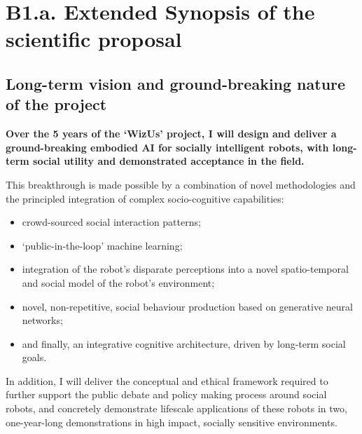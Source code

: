 \documentclass[11pt,a4paper]{report}
\newcommand{\project}{WizUs\xspace}
\newcommand{\eu}[1]{}
\begin{document}

\chapter{B1.a. Extended Synopsis of the scientific proposal}\label{part1}

\eu{(max 5 pages)}

\eu{The Extended Synopsis should give a concise presentation of the scientific
proposal, with particular attention to the ground-breaking nature of the
research project and the feasibility of the outlined scientific approach.
Describe the proposed work in the context of the state of the art of the field.
References to literature should also be included. References do not count
towards the page limits. It is important that this extended synopsis contains
all essential information including the feasibility of the scientific proposal
since the panel will only evaluate Part B1 at step 1.}

\section{Long-term vision and ground-breaking nature of the project}

\begin{framed}

\noindent\bf Over the 5 years of the `\project' project, I will design and deliver a ground-breaking embodied AI for
socially intelligent robots, with long-term social utility and demonstrated
    acceptance in the field.

\vspace{0.3em}
\noindent This breakthrough is made possible by a combination of novel methodologies and
the principled integration of complex socio-cognitive capabilities:

\begin{itemize}
        \item crowd-sourced social interaction patterns;
        \item `public-in-the-loop' machine learning;
        \item integration of the robot's disparate perceptions into a novel
            spatio-temporal and social model of the robot's environment;
        \item novel, non-repetitive, social behaviour production based on
            generative neural networks;
        \item and finally, an integrative cognitive architecture, driven by
            long-term social goals.
\end{itemize}

\vspace{0.3em}
\noindent In addition, I will deliver the conceptual and ethical framework required to
further support the public debate and policy making process around social
robots, and concretely demonstrate lifescale applications of these robots in
two, one-year-long demonstrations in high impact, socially sensitive environments.

\end{framed}
\end{document}
